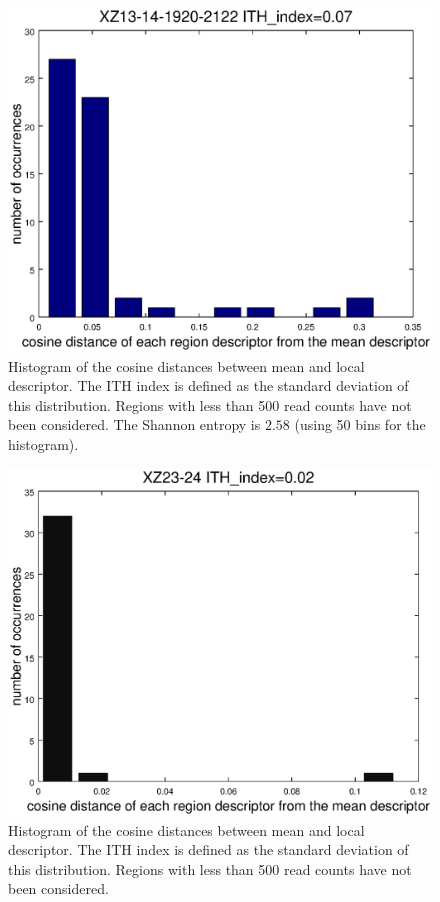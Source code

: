 \documentclass[11pt,a4paper]{article}
\begin{document}
\begin{figure}[hbtp]
\centering
\includegraphics[scale=0.5]{histo_xz131419202122.eps}
\caption{Histogram of the cosine distances between mean and local descriptor. The ITH index is defined as the standard deviation of this distribution. Regions with less than 500 read counts have not been considered. The Shannon entropy is $2.58$ (using 50 bins for the histogram).}
\label{fig:histo_small}
\end{figure}

\begin{figure}[hbtp]
\centering
\includegraphics[scale=0.5]{histo_xz2324.eps}
\caption{Histogram of the cosine distances between mean and local descriptor. The ITH index is defined as the standard deviation of this distribution. Regions with less than 500 read counts have not been considered.}
\label{fig:histo_big}
\end{figure}
\end{document}
